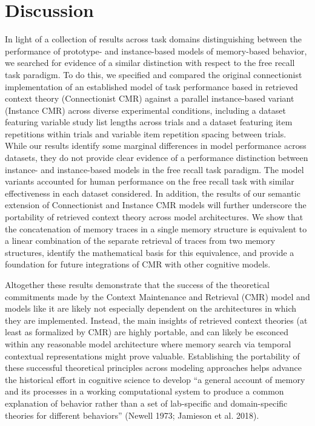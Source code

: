 \documentclass[
  letterpaper,
  11pt,
  english,
  singlespacing,
  headsepline]{MastersDoctoralThesis}
\begin{document}
\section{Discussion}\label{discussion}

In light of a collection of results across task domains distinguishing
between the performance of prototype- and instance-based models of
memory-based behavior, we searched for evidence of a similar distinction
with respect to the free recall task paradigm. To do this, we specified
and compared the original connectionist implementation of an established
model of task performance based in retrieved context theory
(Connectionist CMR) against a parallel instance-based variant (Instance
CMR) across diverse experimental conditions, including a dataset
featuring variable study list lengths across trials and a dataset
featuring item repetitions within trials and variable item repetition
spacing between trials. While our results identify some marginal
differences in model performance across datasets, they do not provide
clear evidence of a performance distinction between instance- and
instance-based models in the free recall task paradigm. The model
variants accounted for human performance on the free recall task with
similar effectiveness in each dataset considered. In addition, the
results of our semantic extension of Connectionist and Instance CMR
models will further underscore the portability of retrieved context
theory across model architectures. We show that the concatenation of
memory traces in a single memory structure is equivalent to a linear
combination of the separate retrieval of traces from two memory
structures, identify the mathematical basis for this equivalence, and
provide a foundation for future integrations of CMR with other cognitive
models.

Altogether these results demonstrate that the success of the theoretical
commitments made by the Context Maintenance and Retrieval (CMR) model
and models like it are likely not especially dependent on the
architectures in which they are implemented. Instead, the main insights
of retrieved context theories (at least as formalized by CMR) are highly
portable, and can likely be esconced within any reasonable model
architecture where memory search via temporal contextual representations
might prove valuable. Establishing the portability of these successful
theoretical principles across modeling approaches helps advance the
historical effort in cognitive science to develop ``a general account of
memory and its processes in a working computational system to produce a
common explanation of behavior rather than a set of lab-specific and
domain-specific theories for different behaviors'' (Newell 1973;
Jamieson et al. 2018).
\end{document}
